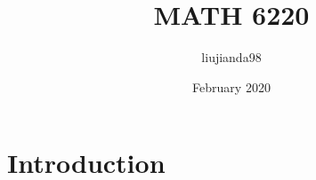 \documentclass{article}
\title{MATH 6220}
\author{liujianda98 }
\date{February 2020}
\begin{document}
\maketitle

\section{Introduction}
\end{document}
